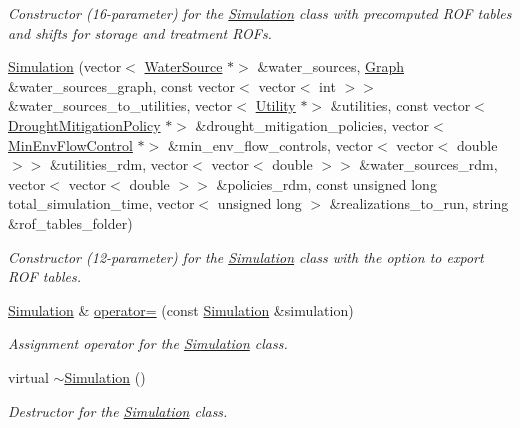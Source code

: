 \begin{DoxyCompactItemize}
\begin{DoxyCompactList}\small\item\em Constructor (16-\/parameter) for the \mbox{\hyperlink{classSimulation}{Simulation}} class with precomputed R\+OF tables and shifts for storage and treatment R\+O\+Fs. \end{DoxyCompactList}\item 
\mbox{\hyperlink{classSimulation_a68f43435cf8308d5415cdfcdb84e1fac}{Simulation}} (vector$<$ \mbox{\hyperlink{classWaterSource}{Water\+Source}} $\ast$$>$ \&water\+\_\+sources, \mbox{\hyperlink{classGraph}{Graph}} \&water\+\_\+sources\+\_\+graph, const vector$<$ vector$<$ int $>$$>$ \&water\+\_\+sources\+\_\+to\+\_\+utilities, vector$<$ \mbox{\hyperlink{classUtility}{Utility}} $\ast$$>$ \&utilities, const vector$<$ \mbox{\hyperlink{classDroughtMitigationPolicy}{Drought\+Mitigation\+Policy}} $\ast$$>$ \&drought\+\_\+mitigation\+\_\+policies, vector$<$ \mbox{\hyperlink{classMinEnvFlowControl}{Min\+Env\+Flow\+Control}} $\ast$$>$ \&min\+\_\+env\+\_\+flow\+\_\+controls, vector$<$ vector$<$ double $>$$>$ \&utilities\+\_\+rdm, vector$<$ vector$<$ double $>$$>$ \&water\+\_\+sources\+\_\+rdm, vector$<$ vector$<$ double $>$$>$ \&policies\+\_\+rdm, const unsigned long total\+\_\+simulation\+\_\+time, vector$<$ unsigned long $>$ \&realizations\+\_\+to\+\_\+run, string \&rof\+\_\+tables\+\_\+folder)
\begin{DoxyCompactList}\small\item\em Constructor (12-\/parameter) for the \mbox{\hyperlink{classSimulation}{Simulation}} class with the option to export R\+OF tables. \end{DoxyCompactList}\item 
\mbox{\hyperlink{classSimulation}{Simulation}} \& \mbox{\hyperlink{classSimulation_acc5a0541c0439cea0604d4d0e38ed3b2}{operator=}} (const \mbox{\hyperlink{classSimulation}{Simulation}} \&simulation)
\begin{DoxyCompactList}\small\item\em Assignment operator for the \mbox{\hyperlink{classSimulation}{Simulation}} class. \end{DoxyCompactList}\item 
virtual \mbox{\hyperlink{classSimulation_a701bd94edc5cf562b5c4e66ae43400bb}{$\sim$\+Simulation}} ()
\begin{DoxyCompactList}\small\item\em Destructor for the \mbox{\hyperlink{classSimulation}{Simulation}} class. \end{DoxyCompactList}\item 

\end{DoxyCompactItemize}

